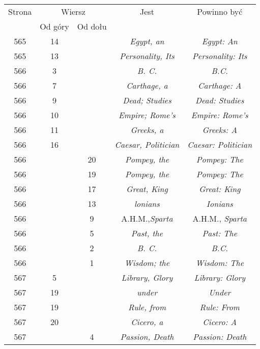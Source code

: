 \documentclass[a4paper,11pt]{article}
\numberwithin{equation}{section}
\begin{document}
\begin{center}
  \begin{tabular}{|c|c|c|c|c|}
    \hline
    Strona & \multicolumn{2}{c|}{Wiersz} & Jest
                              & Powinno być \\ \cline{2-3}
    & Od góry & Od dołu & & \\
    \hline
    565 & 14 & & \textit{Egypt, an} & \textit{Egypt: An} \\
    565 & 13 & & \textit{Personality, Its} & \textit{Personality: Its} \\
    566 & \hphantom{0}3 & & \textit{B. C.} & \textit{B.C.} \\
    566 & \hphantom{0}7 & & \textit{Carthage, a} & \textit{Carthage: A} \\
    566 & \hphantom{0}9 & & \textit{Dead; Studies}
    & \textit{Dead: Studies} \\
    566 & 10 & & \textit{Empire; Rome's} & \textit{Empire: Rome's} \\
    566 & 11 & & \textit{Greeks, a} & \textit{Greeks: A} \\
    566 & 16 & & \textit{Caesar, Politician}
           & \textit{Caesar: Politician} \\
    566 & & 20 & \textit{Pompey, the} & \textit{Pompey: The} \\
    566 & & 19 & \textit{Pompey, the} & \textit{Pompey: The} \\
    566 & & 17 & \textit{Great, King} & \textit{Great: King} \\
    566 & & 13 & \textit{lonians} & \textit{Ionians} \\
    566 & & \hphantom{0}9 & A.H.M.,\textit{Sparta}
    & A.H.M., \textit{Sparta} \\
    566 & & \hphantom{0}5 & \textit{Past, the} & \textit{Past: The} \\
    566 & & \hphantom{0}2 & \textit{B. C.} & \textit{B.C.} \\
    566 & & \hphantom{0}1 & \textit{Wisdom; the} & \textit{Wisdom: The} \\
    567 & \hphantom{0}5 & & \textit{Library, Glory}
    & \textit{Library: Glory} \\
    567 & 19 & & \textit{under} & \textit{Under} \\
    567 & 19 & & \textit{Rule, from} & \textit{Rule: From} \\
    567 & 20 & & \textit{Cicero, a} & \textit{Cicero: A} \\
    567 & & \hphantom{0}4 & \textit{Passion, Death}
    & \textit{Passion: Death} \\

\end{tabular}
\end{center}
\end{document}
